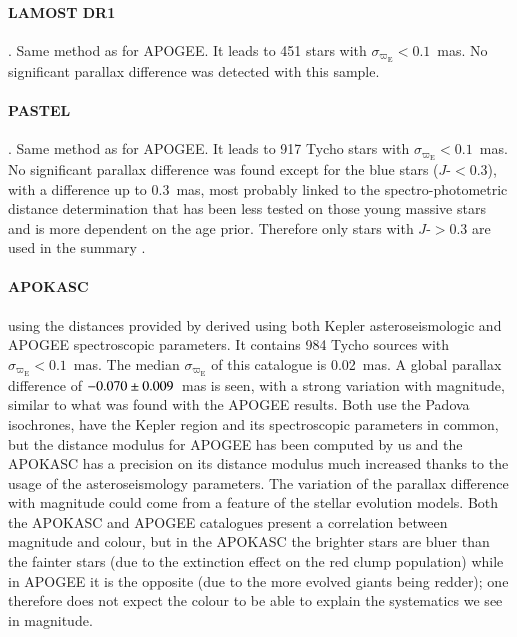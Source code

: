 \paragraph{LAMOST DR1} \citep{LamostDR1}. Same method as for APOGEE. It leads to 451 stars with $\sigma_{\varpi_\mathrm{E}}<0.1$~mas. 
  No significant parallax difference was detected with this sample. 
 
\paragraph{PASTEL} \citep{2016A&A...591A.118S}. Same method as for APOGEE. It leads to 917 Tycho stars with $\sigma_{\varpi_\mathrm{E}}<0.1$~mas. 
  No significant parallax difference was found except for the blue stars ($J$-\Ks$<$0.3), with a difference up to 0.3~mas, most probably linked to the spectro-photometric distance determination that has been less tested on those young massive stars and is more dependent on the age prior. Therefore only stars with $J$-\Ks$>$0.3 are used in the summary . 
 
\paragraph{APOKASC} using the distances provided by \cite{2014MNRAS.445.2758R} derived using both Kepler asteroseismologic and APOGEE spectroscopic parameters. It contains 984 Tycho sources with $\sigma_{\varpi_\mathrm{E}}<0.1$~mas. The median $\sigma_{\varpi_\mathrm{E}}$ of this catalogue is 0.02~mas. 
  A global parallax difference of $-0.070\pm 0.009$~mas is seen, with a strong variation with magnitude, similar to what was found with the APOGEE results. Both use the Padova isochrones, have the Kepler region and its spectroscopic parameters in common, but the distance modulus for APOGEE has been computed by us and the APOKASC has a precision on its distance modulus much increased thanks to the usage of the asteroseismology parameters. The variation of the parallax difference with magnitude could come from a feature of the stellar evolution models. Both the APOKASC and APOGEE catalogues present a correlation between magnitude and colour, but in the APOKASC the brighter stars are bluer than the fainter stars (due to the extinction effect on the red clump population) while in APOGEE it is the opposite (due to the more evolved giants being redder); one therefore does not expect the colour to be able to explain the systematics we see in magnitude. 

